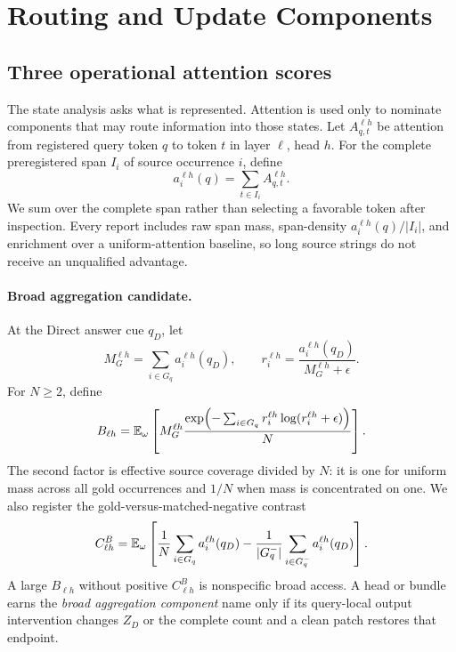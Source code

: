 \section{Routing and Update Components}
\label{sec:routing}

\subsection{Three operational attention scores}

The state analysis asks what is represented. Attention is used only to
nominate components that may route information into those states. Let
\(A_{q,t}^{\ell h}\) be attention from registered query token \(q\) to token
\(t\) in layer \(\ell\), head \(h\). For the complete preregistered span
\(I_i\) of source occurrence \(i\), define
\begin{equation}
  a_i^{\ell h}(q)=\sum_{t\in I_i}A_{q,t}^{\ell h}.
\label{eq:source-mass}
\end{equation}
We sum over the complete span rather than selecting a favorable token after
inspection. Every report includes raw span mass, span-density
\(a_i^{\ell h}(q)/|I_i|\), and enrichment over a uniform-attention baseline,
so long source strings do not receive an unqualified advantage.

\paragraph{Broad aggregation candidate.}
At the Direct answer cue \(q_D\), let
\[
  M_G^{\ell h}=\sum_{i\in G_q}a_i^{\ell h}(q_D),
  \qquad
  r_i^{\ell h}=
  \frac{a_i^{\ell h}(q_D)}{M_G^{\ell h}+\epsilon}.
\]
For \(N\geq2\), define
\begin{equation}
  B_{\ell h}=
  \mathbb{E}_{\omega}\left[
  M_G^{\ell h}
  \frac{
    \exp\!\left(-\sum_{i\in G_q}r_i^{\ell h}
    \log(r_i^{\ell h}+\epsilon)\right)
  }{N}
  \right].
\label{eq:broad-score}
\end{equation}
The second factor is effective source coverage divided by \(N\): it is one
for uniform mass across all gold occurrences and \(1/N\) when mass is
concentrated on one. We also register the gold-versus-matched-negative
contrast
\begin{equation}
  C_{\ell h}^{B}=
  \mathbb{E}_\omega\left[
  \frac{1}{N}\sum_{i\in G_q}a_i^{\ell h}(q_D)
  -
  \frac{1}{|G_q^-|}\sum_{i\in G_q^-}a_i^{\ell h}(q_D)
  \right].
\label{eq:broad-contrast}
\end{equation}
A large \(B_{\ell h}\) without positive \(C_{\ell h}^B\) is nonspecific broad
access. A head or bundle earns the \emph{broad aggregation component} name
only if its query-local output intervention changes \(Z_D\) or the complete
count and a clean patch restores that endpoint.

